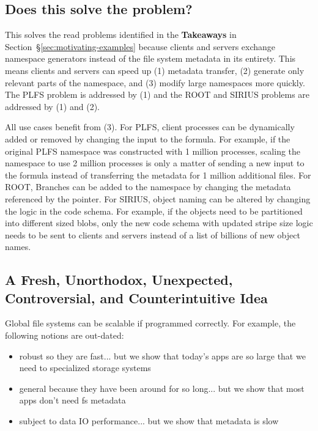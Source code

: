 \subsection*{Does this solve the problem?}

This solves the read problems identified in the \textbf{Takeaways} in
Section~\S\ref{sec:motivating-examples} because clients and servers exchange
namespace generators instead of the file system metadata in its entirety. This
means clients and servers can speed up (1) metadata transfer, (2) generate only
relevant parts of the namespace, and (3) modify large namespaces more quickly.
The PLFS problem is addressed by (1) and the ROOT and SIRIUS problems are
addressed by (1) and (2). 

All use cases benefit from (3). For PLFS, client processes can be dynamically
added or removed by changing the input to the formula.  For example, if the
original PLFS namespace was constructed with 1 million processes, scaling the
namespace to use 2 million processes is only a matter of sending a new input to
the formula instead of transferring the metadata for 1 million additional
files. For ROOT, Branches can be added to the namespace by changing the
metadata referenced by the pointer. For SIRIUS, object naming can be altered by
changing the logic in the code schema.  For example, if the objects need to be
partitioned into different sized blobs, only the new code schema with updated
stripe size logic needs to be sent to clients and servers instead of a list of
billions of new object names.

\subsection*{A Fresh, Unorthodox, Unexpected, Controversial, and Counterintuitive Idea}

Global file systems can be scalable if programmed correctly. For example, the
following notions are out-dated:

\begin{itemize}
  \setlength\itemsep{-0.5em}

  \item robust so they are fast... but we show that today's apps are so large
  that we need to specialized storage systems

  \item general because they have been around for so long... but we show that
  most apps don't need fs metadata

  \item subject to data IO performance... but we show that metadata is slow

\end{itemize}


